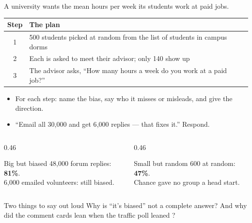 \documentclass[aspectratio=169, 11pt]{beamer}
\begin{document}
\begin{frame}[t, plain]
  A university wants the mean hours per week its students work at paid jobs.
  \vspace{4pt}
  \begin{center}
  {\small\renewcommand{\arraystretch}{1.3}
  \begin{tabular}{@{} c l @{}}
    \textbf{Step} & \textbf{The plan} \\ \hline
    1 & 500 students picked at random from the list of students in campus dorms \\
    2 & Each is asked to meet their advisor; only 140 show up \\
    3 & The advisor asks, ``How many hours a week do you work at a paid job?'' \\
  \end{tabular}}
  \end{center}
  \begin{itemize}\setlength{\itemsep}{3pt}
    \item For each step: name the bias, say who it misses or misleads, and give the direction.
    \item ``Email all 30{,}000 and get 6{,}000 replies --- that fixes it.'' Respond.
  \end{itemize}
\end{frame}

\begin{frame}[t, plain]
  \vspace{6pt}
  \begin{columns}[t]
    \begin{column}{0.46\textwidth}
      \begin{block}{Big but biased}
        48{,}000 forum replies: \textbf{81\%}.\\
        6{,}000 emailed volunteers: still biased.
      \end{block}
    \end{column}
    \begin{column}{0.46\textwidth}
      \begin{block}{Small but random}
        600 at random: \textbf{47\%}.\\
        Chance gave no group a head start.
      \end{block}
    \end{column}
  \end{columns}
  \vspace{10pt}
  \begin{block}{Two things to say out loud}
    Why is ``it's biased'' not a complete answer? And why did the comment cards lean
     when the traffic poll leaned ?
  \end{block}
\end{frame}
\end{document}
